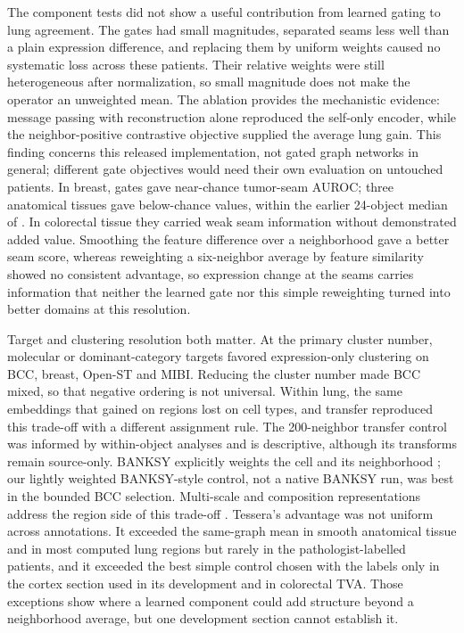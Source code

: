 \documentclass[11pt]{article}
\begin{document}
The component tests did not show a useful contribution from learned gating to lung agreement. The gates had small magnitudes, separated seams less well than a plain expression difference, and replacing them by uniform weights caused no systematic loss across these patients. Their relative weights were still heterogeneous after normalization, so small magnitude does not make the operator an unweighted mean. The ablation provides the mechanistic evidence: message passing with reconstruction alone reproduced the self-only encoder, while the neighbor-positive contrastive objective supplied the average lung gain. This finding concerns this released implementation, not gated graph networks in general; different gate objectives would need their own evaluation on untouched patients. In breast, gates gave near-chance tumor-seam AUROC; three anatomical tissues gave below-chance values, within the earlier 24-object median of \LandGateMedian{}. In colorectal tissue they carried weak seam information without demonstrated added value. Smoothing the feature difference over a neighborhood gave a better seam score, whereas reweighting a six-neighbor average by feature similarity showed no consistent advantage, so expression change at the seams carries information that neither the learned gate nor this simple reweighting turned into better domains at this resolution.

Target and clustering resolution both matter. At the primary cluster number, molecular or dominant-category targets favored expression-only clustering on BCC, breast, Open-ST and MIBI. Reducing the cluster number made BCC mixed, so that negative ordering is not universal. Within lung, the same embeddings that gained on regions lost on cell types, and transfer reproduced this trade-off with a different assignment rule. The 200-neighbor transfer control was informed by within-object analyses and is descriptive, although its transforms remain source-only. BANKSY explicitly weights the cell and its neighborhood \citep{singhal2024banksy}; our lightly weighted BANKSY-style control, not a native BANKSY run, was best in the bounded BCC selection. Multi-scale and composition representations address the region side of this trade-off \citep{yuan2024mender,liang2026cellniche}. Tessera's advantage was not uniform across annotations. It exceeded the same-graph mean in smooth anatomical tissue and in most computed lung regions but rarely in the pathologist-labelled patients, and it exceeded the best simple control chosen with the labels only in the cortex section used in its development and in colorectal TVA. Those exceptions show where a learned component could add structure beyond a neighborhood average, but one development section cannot establish it.
\end{document}
